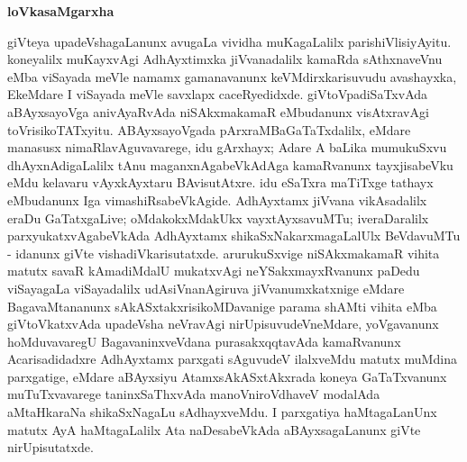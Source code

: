 \newpage

\begin{center}
\textbf{\Large{loVkasaMgarxha}}
\end{center}

giVteya upadeVshagaLanunx avugaLa vividha muKagaLalilx parishiVlisiyAyitu. koneyalilx muKayxvAgi AdhAyxtimxka jiVvanadalilx kamaRda sAthxnaveVnu eMba viSayada meVle namamx gamanavanunx keVMdirxkarisuvudu avashayxka, EkeMdare I viSayada meVle savxlapx caceRyedidxde. giVtoVpadiSaTxvAda aBAyxsayoVga anivAyaRvAda niSAkxmakamaR eMbudanunx visAtxravAgi toVrisikoTATxyitu. ABAyxsayoVgada pArxraMBaGaTaTxdalilx, eMdare manasusx nimaRlavAguvavarege, idu gArxhayx; Adare A baLika mumukuSxvu dhAyxnAdigaLalilx tAnu maganxnAgabeVkAdAga kamaRvanunx tayxjisabeVku eMdu kelavaru vAyxkAyxtaru BAvisutAtxre. idu eSaTxra maTiTxge tathayx eMbudanunx Iga vimashiRsabeVkAgide. AdhAyxtamx jiVvana vikAsadalilx eraDu GaTatxgaLive; oMdakokxMdakUkx vayxtAyxsavuMTu; iveraDaralilx parxyukatxvAgabeVkAda AdhAyxtamx shikaSxNakarxmagaLalUlx BeVdavuMTu - idanunx giVte vishadiVkarisutatxde. arurukuSxvige niSAkxmakamaR vihita matutx savaR kAmadiMdalU mukatxvAgi neYSakxmayxRvanunx paDedu viSayagaLa viSayadalilx udAsiVnanAgiruva jiVvanumxkatxnige eMdare BagavaMtananunx sAkASxtakxrisikoMDavanige parama shAMti vihita eMba giVtoVkatxvAda upadeVsha neVravAgi nirUpisuvudeVneMdare, yoVgavanunx hoMduvavaregU BagavaninxveVdana purasakxqqtavAda kamaRvanunx Acarisadidadxre AdhAyxtamx parxgati sAguvudeV ilalxveMdu matutx muMdina parxgatige, eMdare aBAyxsiyu AtamxsAkASxtAkxrada koneya GaTaTxvanunx muTuTxvavarege taninxSaThxvAda manoVniroVdhaveV modalAda aMtaHkaraNa shikaSxNagaLu sAdhayxveMdu. I parxgatiya haMtagaLanUnx matutx AyA haMtagaLalilx Ata naDesabeVkAda aBAyxsagaLanunx giVte nirUpisutatxde.


